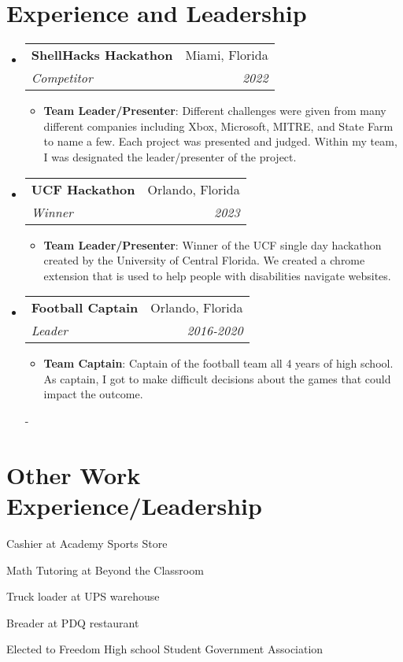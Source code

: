\documentclass[a4paper,20pt]{article}
\makeatletter
\newcommand{\resumeItem}[2]{
  \item\normalsize{
    \textbf{#1}{: #2 \vspace{1pt}}
  }
}
\newcommand{\resumeSubheading}[4]{
  \vspace{-1pt}\item
    \begin{tabular*}{.97\textwidth}{l@{\extracolsep{\fill}}r}
      \large\textbf{#1} & #2 \\
      \textit{#3} & \textit{#4} \\
    \end{tabular*}\vspace{-5pt}
}
\newcommand{\resumeSubHeadingListStart}{\begin{itemize}[leftmargin=*]}
\newcommand{\resumeSubHeadingListEnd}{\end{itemize}}
\newcommand{\resumeItemListStart}{\begin{itemize}}
\newcommand{\resumeItemListEnd}{\end{itemize}\vspace{-5pt}}
\makeatother
\begin{document}
    \section{Experience and Leadership}
        \resumeSubHeadingListStart
            \resumeSubheading{ShellHacks Hackathon}{Miami, Florida}{Competitor}{2022}
                \resumeItemListStart
                    \resumeItem{Team Leader/Presenter}{Different challenges were given from many different companies including Xbox, Microsoft, MITRE, and State Farm to name a few. Each project was presented and judged. Within my team, I was designated the leader/presenter of the project.}
                \resumeItemListEnd
                 \resumeSubheading{UCF Hackathon}{Orlando, Florida}{Winner}{2023}
                \resumeItemListStart
                    \resumeItem{Team Leader/Presenter}{Winner of the UCF single day hackathon created by the University of Central Florida. We created a chrome extension that is used to help people with disabilities navigate websites. }
                \resumeItemListEnd
                \resumeSubheading{Football Captain}{Orlando, Florida}{Leader}{2016-2020}
                \resumeItemListStart
                    \resumeItem{Team Captain}{Captain of the football team all 4 years of high school. As captain, I got to make difficult decisions about the games that could impact the outcome.}
                \resumeItemListEnd
                    
                    -
          \resumeSubHeadingListEnd
    
    
    
    \section{Other Work Experience/Leadership}
        \begin{description}[font=$\bullet$]
            \item {Cashier at Academy Sports Store}
            \item {Math Tutoring at Beyond the Classroom}
            \item {Truck loader at UPS warehouse}
            \item {Breader at PDQ restaurant}
            \item {Elected to Freedom High school Student Government Association}
            
        \end{description}
        
        
\end{document}
